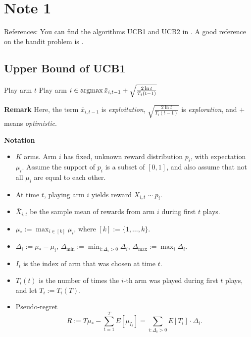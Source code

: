 \section{Note 1}

References: You can find the algorithms UCB1 and UCB2 in \cite{Auer2002}.
A good reference on the bandit problem is \cite{MAL024}.

\subsection{Upper Bound of UCB1} %

\begin{alg}[UCB1] \leavevmode
    \begin{framed}
        \begin{algorithmic}
                \State Play arm $t$
            \EndFor
                \State Play arm $i\in\mathop{\mathrm{argmax}} \bar x_{i,t-1} + \sqrt{\frac{2\ln t}{T_i(t-1)}}$
            \EndFor
        \end{algorithmic}
    \end{framed}
\end{alg}

\textbf{Remark}
Here,
the term $\bar x_{i,t-1}$ is \emph{exploitation},
$\sqrt{\frac{2\ln t}{T_i(t-1)}}$ is \emph{exploration},
and $+$ means \emph{optimistic}.

\textbf{Notation}
\begin{itemize}
    \item $K$ arms.
        Arm $i$ has fixed, unknown reward distribution $p_i$,
        with expectation $\mu_i$.
        Assume the support of $p_i$ is a subset of $[0,1]$, and
        also assume that not all $\mu_i$ are equal to each other.
    \item At time $t$, playing arm $i$ yields reward $X_{i,t}\sim p_i$.
    \item $\bar X_{i,t}$ be the sample mean of rewards from arm $i$ during first $t$ plays.
    \item $\mu_*:=\max_{i\in[k]}\mu_i$, where $[k]:=\{1,\dots,k\}$.
    \item $\Delta_i:=\mu_* - \mu_i$,
        $\Delta_{\text{min}}:=\min_{i:\Delta_i>0}\Delta_i$,
        $\Delta_{\text{max}}:=\max_i \Delta_i$.
    \item $I_t$ is the index of arm that was chosen at time $t$.
    \item $T_i(t)$ is the number of times the $i$-th arm was played during first $t$ plays,
        and let $T_i:=T_i(T)$.
    \item Pseudo-regret
        \begin{equation}
            R:=T\mu_*-\sum_{t=1}^T E[\mu_{I_t}]
            = \sum_{i:\Delta_i>0} E[T_i]\cdot\Delta_i.
        \end{equation}
\end{itemize}

